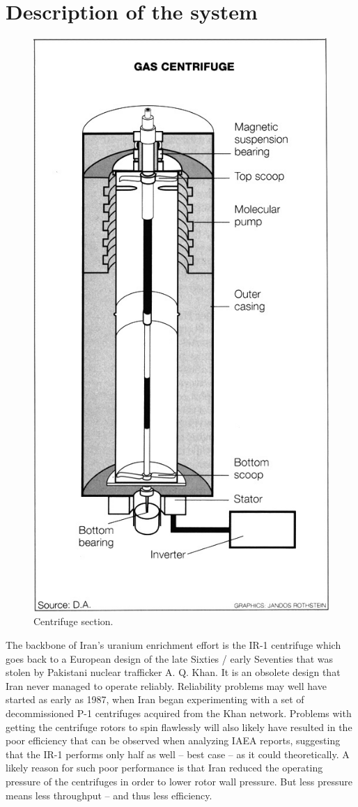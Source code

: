 \documentclass[12pt]{article}
\begin{document}
\section{Description of the system}
    \begin{figure}
    \centering
    \includegraphics[height=0.65\textwidth]{figures/centrifugeAlternative.jpg}
    \caption{Centrifuge section.}
    \label{fig:centrifuge1}
    \end{figure}
The backbone of Iran’s uranium enrichment effort is the IR-1 centrifuge which goes back to a European design of the late Sixties / early Seventies that was stolen by Pakistani nuclear trafficker A. Q. Khan. It is an obsolete design that Iran never managed to operate reliably. Reliability problems may well have started as early as 1987, when Iran began experimenting with a set of decommissioned P-1 centrifuges acquired from the Khan network. Problems with getting the centrifuge rotors to spin flawlessly will also likely have resulted in the poor
efficiency that can be observed when analyzing IAEA reports\cite{iaeareport}, suggesting that the IR-1 performs only half as well – best case – as it could theoretically. A likely reason for such poor performance is that Iran reduced the operating pressure of the centrifuges in order to lower rotor wall pressure. But less pressure means less throughput – and thus less efficiency.
\end{document}
